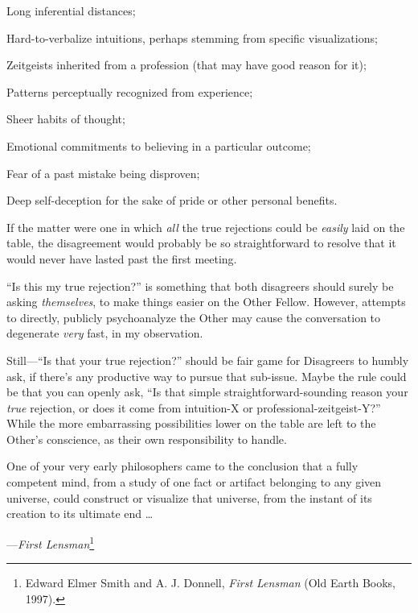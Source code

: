 {
 Long inferential distances;}

{
 Hard-to-verbalize intuitions, perhaps stemming from specific
visualizations;}

{
 Zeitgeists inherited from a profession (that may have good reason
for it);}

{
 Patterns perceptually recognized from experience;}

{
 Sheer habits of thought;}

{
 Emotional commitments to believing in a particular outcome;}

{
 Fear of a past mistake being disproven;}

{
 Deep self-deception for the sake of pride or other personal
benefits.}

{
 If the matter were one in which \textit{all} the true rejections
could be \textit{easily} laid on the table, the disagreement would
probably be so straightforward to resolve that it would never have
lasted past the first meeting.}

{
 ``Is this my true rejection?''
is something that both disagreers should surely be asking
\textit{themselves}, to make things easier on the Other Fellow.
However, attempts to directly, publicly psychoanalyze the Other may
cause the conversation to degenerate \textit{very} fast, in my
observation.}

{
 Still---``Is that your true
rejection?'' should be fair game for Disagreers to
humbly ask, if there's any productive way to pursue
that sub-issue. Maybe the rule could be that you can openly ask,
``Is that simple straightforward-sounding reason your
\textit{true} rejection, or does it come from intuition-X or
professional-zeitgeist-Y?'' While the more
embarrassing possibilities lower on the table are left to the
Other's conscience, as their own responsibility to
handle.}

\myendsectiontext


{
 One of your very early philosophers came to the conclusion that a
fully competent mind, from a study of one fact or artifact belonging to
any given universe, could construct or visualize that universe, from
the instant of its creation to its ultimate end \ldots}

{\raggedleft
 {}---\textit{First Lensman}\footnote{Edward Elmer Smith and A. J. Donnell, \textit{First Lensman}
(Old Earth Books, 1997).}
\par}


